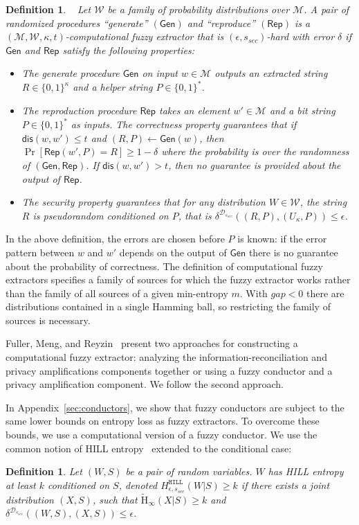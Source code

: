 \documentclass[11pt]{article}
\newcommand{\apref}[1]{\mbox{Appendix~\ref{#1}}}
\newcommand{\class}[1]{{\ensuremath{\mathsf{#1}}}}
\newcommand{\gen}{\ensuremath{\class{Gen}}\xspace}
\newcommand{\rep}{\ensuremath{\class{Rep}}\xspace}
\newcommand{\dis}{\ensuremath{\mathsf{dis}}}
\newcommand{\hill}{\ensuremath{\mathtt{HILL}}\xspace}
\newcommand{\Hav}{\tilde{\mathrm{H}}_\infty}
\newtheorem{definition}[theorem]{Definition}
\begin{document}
\begin{definition}~\cite[Definition 2.5]{fuller2013computational}
\label{def:comp fuzzy extractor}
Let $\mathcal{W}$ be a family of probability distributions over $\mathcal{M}$. A pair of randomized procedures ``generate'' $(\gen)$ and ``reproduce'' $(\rep)$ is a $(\mathcal{M}, \mathcal{W}, \kappa, t)$-\emph{computational fuzzy extractor} that is $(\epsilon, s_{sec})$-hard with error $\delta$ if \gen and \rep satisfy the following properties:
\begin{itemize}
\item The generate procedure \gen on input $w\in \mathcal{M}$ outputs an extracted string $R\in\{0,1\}^\kappa$ and a helper string $P\in\{0,1\}^*$.
\item The reproduction procedure \rep takes an element $w'\in\mathcal{M}$ and a bit string $P\in\{0,1\}^*$ as inputs.  The \emph{correctness} property guarantees that if $\dis(w, w')\leq t$ and $(R, P)\leftarrow \gen(w)$, then $\Pr[\rep( w', P) = R] \geq 1-\delta$ where the probability is over the randomness of $(\gen, \rep)$.  
If $\dis(w, w') > t$, then no guarantee is provided about the output of \rep.
\item The \emph{security} property guarantees that for any distribution $W\in \mathcal{W}$, the string $R$ is pseudorandom conditioned on $P$, that is $\delta^{\mathcal{D}_{s_{sec}}}((R, P), (U_\kappa, P))\leq \epsilon$.
\end{itemize}
\end{definition}
In the above definition, the errors are chosen before $P$ is known: if the error pattern between $w$ and $w'$ depends on the output of $\gen$ there is no guarantee about the probability of correctness.
The definition of computational fuzzy extractors specifies a family of sources for which the fuzzy extractor works rather than the family of all sources of a given min-entropy $m$.  With $gap<0$ there are distributions contained in a single Hamming ball, so restricting the family of sources is necessary.

Fuller, Meng, and Reyzin~\cite{fuller2013computational} present two approaches for constructing a computational fuzzy extractor: analyzing the information-reconciliation and privacy amplifications components together or using a fuzzy conductor and a privacy amplification component.  We follow the second approach.  

In \apref{sec:conductors}, we show that fuzzy conductors are subject to the same lower bounds on entropy loss as fuzzy extractors.  To overcome these bounds, we use a computational version of a fuzzy conductor.  
We use the common notion of HILL entropy~\cite{DBLP:journals/siamcomp/HastadILL99} extended to the conditional case:
\begin{definition}
\label{def:hill ent}
Let $(W, S)$ be a pair of random variables.  $W$ has 
\emph{HILL entropy} at least $k$ conditioned on $S$,
denoted $H^{\hill}_{\epsilon, s_{sec}}(W|S)\geq k$ if there exists a joint distribution $(X, S)$, such that $\Hav(X|S)\geq k$ and $\delta^{\mathcal{D}_{s_{sec}}} ((W, S),(X,S))\leq \epsilon$.
\end{definition}
\end{document}
